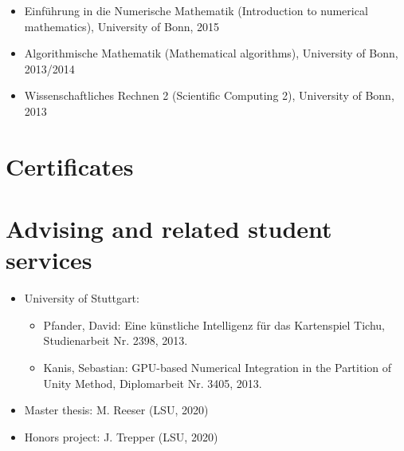 \documentclass[11pt,a4paper,sans]{moderncv}
\begin{document}
\begin{itemize}[leftmargin=4cm]
\item Einf\"uhrung in die Numerische Mathematik (Introduction to numerical mathematics), University of Bonn, 2015
\item Algorithmische Mathematik (Mathematical algorithms), University of Bonn, 2013/2014
\item Wissenschaftliches Rechnen 2 (Scientific Computing 2),  University of Bonn, 2013 
\end{itemize}


\section{Certificates}

\section{Advising and related student services}
\begin{itemize}[leftmargin=4cm]
\item University of Stuttgart:
\begin{itemize}
\item Pfander, David: Eine künstliche Intelligenz für das Kartenspiel Tichu, Studienarbeit Nr. 2398, 2013.
\item Kanis, Sebastian: GPU-based Numerical Integration in the Partition of Unity Method, Diplomarbeit Nr. 3405, 2013.
\end{itemize}
\end{itemize}

\begin{itemize}[leftmargin=4cm]
\item Master thesis: M. Reeser (LSU, 2020)
\item Honors project: J. Trepper (LSU, 2020)
\end{itemize}
\end{document}
